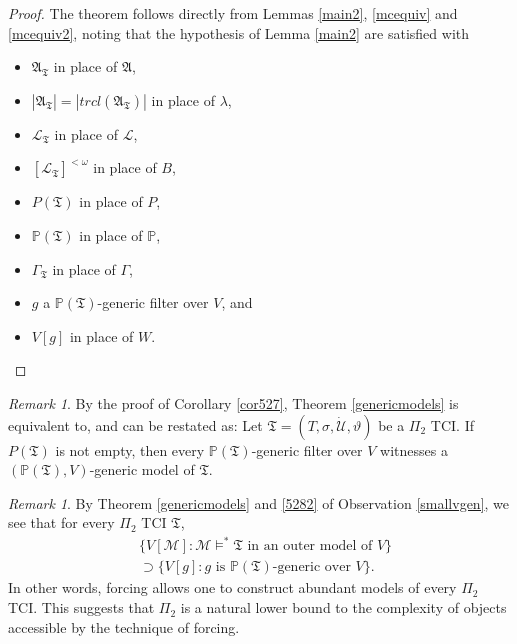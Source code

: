 \documentclass[12pt, twoside]{memoir}
\numberwithin{equation}{section}
\theoremstyle{definition}
\theoremstyle{remark}
\newtheorem{rem}[thm]{Remark}
\theoremstyle{definition}
\newenvironment{customthm}[1]
  {\renewcommand\theinnercustomthm{#1}\innercustomthm}
  {\endinnercustomthm}
\theoremstyle{definition}
\theoremstyle{definition}
\theoremstyle{remark}
\begin{document}
\begin{proof}
The theorem follows directly from Lemmas \ref{main2}, \ref{mcequiv} and \ref{mcequiv2}, noting that the hypothesis of Lemma \ref{main2} are satisfied with
\begin{itemize}
    \item $\mathfrak{A}_{\mathfrak{T}}$ in place of $\mathfrak{A}$,
    \item $|\mathfrak{A}_{\mathfrak{T}}| = |trcl(\mathfrak{A}_{\mathfrak{T}})|$ in place of $\lambda$,
    \item $\mathcal{L}_{\mathfrak{T}}$ in place of $\mathcal{L}$,
    \item $[\mathcal{L}_{\mathfrak{T}}]^{< \omega}$ in place of $B$,
    \item $P(\mathfrak{T})$ in place of $P$,
    \item $\mathbb{P}(\mathfrak{T})$ in place of $\mathbb{P}$, 
    \item $\Gamma_{\mathfrak{T}}$ in place of $\Gamma$,
    \item $g$ a $\mathbb{P}(\mathfrak{T})$-generic filter over $V$, and
    \item $V[g]$ in place of $W$. \qedhere
\end{itemize}
\end{proof}

\begin{rem}\label{rem537}
By the proof of Corollary \ref{cor527}, Theorem \ref{genericmodels} is equivalent to, and can be restated as:
\begin{customthm}{4.2.20$'$}
Let $\mathfrak{T} = (T, \sigma, \dot{\mathcal{U}}, \vartheta)$ be a $\Pi_2$ TCI. If $P(\mathfrak{T})$ is not empty, then every $\mathbb{P}(\mathfrak{T})$-generic filter over $V$ witnesses a $(\mathbb{P}(\mathfrak{T}), V)$-generic model of $\mathfrak{T}$.
\end{customthm}
\end{rem}

\begin{rem}\label{ramble2}
By Theorem \ref{genericmodels} and \ref{5282} of Observation \ref{smallvgen}, we see that for every $\Pi_2$ TCI $\mathfrak{T}$,
\begin{align*}
    & \{V[\mathcal{M}] : \mathcal{M} \models^* \mathfrak{T} \text{ in an outer model of } V\} \\
    & \supset \{V[g] : g \text{ is } \mathbb{P}(\mathfrak{T}) \text{-generic over } V\} \text{.}
\end{align*}
In other words, forcing allows one to construct abundant models of every $\Pi_2$ TCI. This suggests that $\Pi_2$ is a natural lower bound to the complexity of objects accessible by the technique of forcing.
\end{rem}
\end{document}

